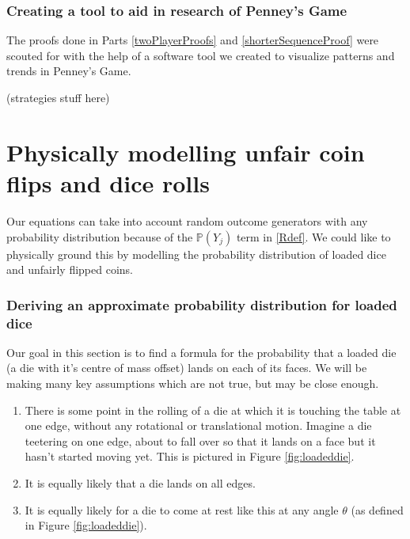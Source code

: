 \documentclass[english,12pt,a4paper,final]{article}
\begin{document}
\section {Creating a tool to aid in research of Penney's Game}

The proofs done in Parts \ref{twoPlayerProofs} and \ref{shorterSequenceProof} were scouted for with the help of a software tool we created to visualize patterns and trends in Penney's Game.

(strategies stuff here)

\part {Physically modelling unfair coin flips and dice rolls \label{physicalModelling}}

Our equations can take into account random outcome generators with any probability distribution because of the $\mathbb{P}(Y_j)$ term in \eqref{Rdef}. We could like to physically ground this by modelling the probability distribution of loaded dice and unfairly flipped coins.

\section{Deriving an approximate probability distribution for loaded dice}

Our goal in this section is to find a formula for the probability that a loaded die (a die with it's centre of mass offset) lands on each of its faces. We will be making many key assumptions which are not true, but may be close enough.

\begin{enumerate}
	\item There is some point in the rolling of a die at which it is touching the table at one edge, without any rotational or translational motion. Imagine a die teetering on one edge, about to fall over so that it lands on a face but it hasn't started moving yet. This is pictured in Figure \ref{fig:loadeddie}.
	\item It is equally likely that a die lands on all edges.
	\item It is equally likely for a die to come at rest like this at any angle $\theta$ (as defined in Figure \ref{fig:loadeddie}).
\end{enumerate}
\end{document}
